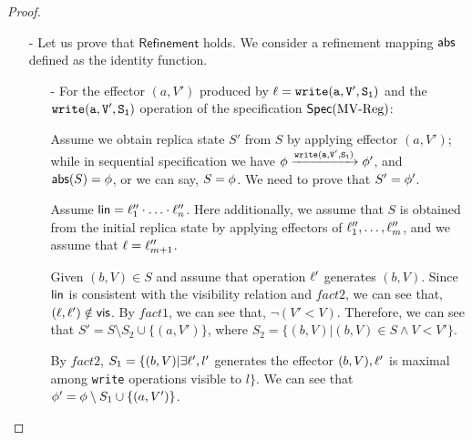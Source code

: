 \begin {proof}
\begin{itemize}
\begin{itemize}
    \item[-] $(b,V) = (a_2,V_2)$, $V_2 < V_1$, or there exists $(c,V_c) \in S$, such that $V_2 < V_c$.
    \end{itemize}


\item[-] Let us prove that $\mathsf{Refinement}$ holds. We consider a refinement mapping $\mathsf{abs}$ defined as the identity function.

    \begin{itemize}
    \setlength{\itemsep}{0.5pt}
    \item[-] For the effector $(a,V')$ produced by $\alabel = \alabelshort[{\tt write}]{a,V',S_1}$ and the $\alabelshort[{\tt write}]{a,V',S_1}$ operation of the specification $\mathsf{Spec}(\text{MV\text{-}Reg})$:


    Assume we obtain replica state $S'$ from $S$ by applying effector $(a,V')$; while in sequential specification we have $\abstate \xrightarrow{\alabelshort[{\tt write}]{a,V',S_1}} \abstate'$, and $\mathsf{abs}(S) = \phi$, or we can say, $S = \phi$. We need to prove that $S' = \phi'$.

    Assume $\mathsf{lin} = \ell''_1 \cdot \ldots \cdot \ell''_n$. Here additionally, we assume that $S$ is obtained from the initial replica state by applying effectors of $\ell''_1,\ldots,\ell''_m$, and we assume that $\ell = \ell''_{m+1}$.

    Given $(b,V) \in S$ and assume that operation $\ell'$ generates $(b,V)$. Since $\mathsf{lin}$ is consistent with the visibility relation and $fact2$, we can see that, $(\ell,\ell') \notin \mathsf{vis}$. By $fact1$, we can see that, $\neg (V' < V)$. Therefore, we can see that $S' = S \setminus S_2 \cup \{ (a,V') \}$, where $S_2 = \{ (b,V) \vert (b,V) \in S \wedge V < V' \}$.



    By $fact2$, $S_1 = \{ (b,V) \vert \exists \ell', l'$ generates the effector $(b,V), \ell'$ is maximal among {\tt write} operations visible to $l \}$. We can see that $\phi' = \phi \setminus S_1 \cup \{ (a,V') \}$.


\end{itemize}
\end{itemize}
\end{proof}
